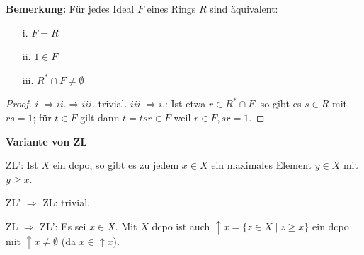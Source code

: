 \documentclass[headsepline=true,DIV=11]{scrartcl}
\theoremstyle{definition}
\newenvironment{gelaber}{}{}
\begin{document}
\begin{gelaber}
  {\bf Bemerkung:} Für jedes Ideal $F$ eines Rings $R$ sind äquivalent:
  \begin{itemize}
    \item[i.] $F=R$
    \item[ii.] $1\in F$
    \item[iii.] $R^*\cap F\neq\emptyset$
  \end{itemize}
  \begin{proof}
    $i.\Rightarrow ii.\Rightarrow iii.$ trivial. $iii.\Rightarrow i.$: Ist etwa $r\in R^*\cap F$, so gibt es $s\in R$ mit $rs=1$; für $t\in F$ gilt
    dann $t=tsr\in F$ weil $r\in F, sr=1$.
  \end{proof}
\end{gelaber}

\begin{gelaber}
  {\bf Variante von ZL}

  ZL': Ist $X$ ein dcpo, so gibt es zu jedem $x\in X$ ein maximales Element $y\in X$ mit $y\ge x$.

  ZL' $\Rightarrow$ ZL: trivial.

  ZL $\Rightarrow$ ZL': Es sei $x\in X$. Mit $X$ dcpo ist auch $\uparrow x = \{z\in X\mid z\ge x\}$ ein dcpo mit $\uparrow x \neq\emptyset$ (da
  $x\in\uparrow x$).
\end{gelaber}
\end{document}
